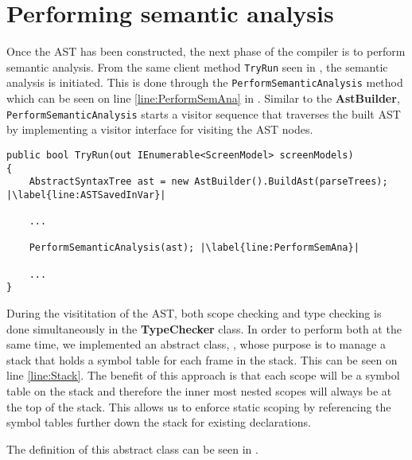 \section{Performing semantic analysis}

Once the AST has been constructed, the next phase of the compiler is to perform semantic analysis. From the same client method \texttt{TryRun} seen in , the semantic analysis is initiated. This is done through the \texttt{PerformSemanticAnalysis} method which can be seen on line \ref{line:PerformSemAna} in .
Similar to the \textbf{AstBuilder}, \texttt{PerformSemanticAnalysis} starts a visitor sequence that traverses the built AST by implementing a visitor interface for visiting the AST nodes.

\begin{lstlisting}[language=CSharp, caption={The Run method that serves as a client inside the DazelCompiler class}, label={lst:RunMethodSecond},escapechar=|]
public bool TryRun(out IEnumerable<ScreenModel> screenModels)
{
    AbstractSyntaxTree ast = new AstBuilder().BuildAst(parseTrees); |\label{line:ASTSavedInVar}|

    ...
    
    PerformSemanticAnalysis(ast); |\label{line:PerformSemAna}|

    ...
}
\end{lstlisting}

During the visititation of the AST, both scope checking and type checking is done simultaneously in the \textbf{TypeChecker} class. 
In order to perform both at the same time, we implemented an abstract class, \abstractsemanticclass{}, whose purpose is to manage a stack that holds a symbol table for each frame in the stack. This can be seen on line \ref{line:Stack}. The benefit of this approach is that each scope will be a symbol table on the stack and therefore the inner most nested scopes will always be at the top of the stack. This allows us to enforce static scoping by referencing the symbol tables further down the stack for existing declarations.

The definition of this abstract class can be seen in .

